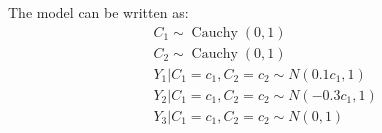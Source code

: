 \documentclass{article}
\DeclareMathOperator{\Cauchy}{Cauchy}
\begin{document}



The model can be written as:
\begin{align*}
& C_1 \sim \Cauchy(0,1)\\
& C_2 \sim \Cauchy(0,1)\\
& Y_1|C_1=c_1, C_2=c_2 \sim N(0.1 c_1, 1)\\
& Y_2|C_1=c_1, C_2=c_2 \sim N(-0.3 c_1, 1)\\
& Y_3|C_1=c_1, C_2=c_2 \sim N(0,1)
\end{align*}
\end{document}
